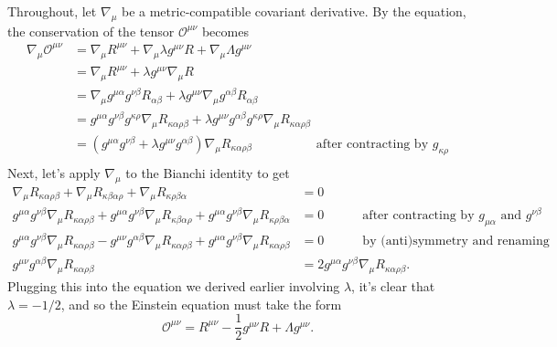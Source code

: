 \documentclass{../../templates/lkx_pset}
\begin{document}
\begin{solution}
  Throughout, let $\nabla_\mu$ be a metric-compatible covariant derivative.
  By the equation, the conservation of the tensor $\mathcal{O}^{\mu\nu}$ becomes
  \[
    \begin{aligned}
      \nabla_\mu \mathcal{O}^{\mu\nu}&= \nabla_\mu R^{\mu\nu} + \nabla_\mu \lambda g^{\mu\nu}R + \nabla_\mu\Lambda g^{\mu\nu}\\
      &= \nabla_\mu R^{\mu\nu} + \lambda g^{\mu\nu}\nabla_\mu R\\
      &= \nabla_\mu g^{\mu\alpha}g^{\nu\beta}R_{\alpha\beta} + \lambda g^{\mu\nu}\nabla_\mu g^{\alpha\beta}R_{\alpha\beta}\\
      &= 
      g^{\mu\alpha} g^{\nu\beta} g^{\kappa\rho} \nabla_\mu R_{\kappa\alpha\rho\beta}
      +\lambda g^{\mu\nu}g^{\alpha\beta} g^{\kappa\rho} \nabla_\mu R_{\kappa\alpha\rho\beta} \\
      &= (g^{\mu\alpha}g^{\nu\beta} + \lambda g^{\mu\nu}g^{\alpha\beta}) \nabla_\mu R{_{\kappa\alpha\rho\beta}}\hspace{5em}\textrm{after contracting by }g_{\kappa\rho} \\
    \end{aligned}
  \]
  Next, let's apply $\nabla_\mu$ to the Bianchi identity to get
  \[
    \begin{aligned}
      \nabla_\mu R_{\kappa\alpha\rho\beta} + \nabla_\mu R_{\kappa\beta\alpha\rho} + \nabla_\mu R_{\kappa\rho\beta\alpha}
      &=0\\
      g^{\mu\alpha} g^{\nu\beta} \nabla_\mu R_{\kappa\alpha\rho\beta} +  g^{\mu\alpha} g^{\nu\beta}  \nabla_\mu R_{\kappa\beta\alpha\rho} + g^{\mu\alpha} g^{\nu\beta} \nabla_\mu R_{\kappa\rho\beta\alpha}
      &=0 \hspace{3em}\textrm{after contracting by } g_{\mu\alpha}\textrm{ and }g^{\nu\beta} \\
        g^{\mu\alpha} g^{\nu\beta} \nabla_\mu R_{\kappa\alpha\rho\beta} 
      - g^{\mu\nu} g^{\alpha\beta} \nabla_\mu R_{\kappa\alpha\rho\beta} 
      + g^{\mu\alpha} g^{\nu\beta} \nabla_\mu R_{\kappa\alpha\rho\beta}
      &=0 \hspace{3em}\textrm{by (anti)symmetry and renaming variables} \\
      g^{\mu\nu}g^{\alpha\beta}\nabla_\mu R_{\kappa\alpha\rho\beta} &= 2g^{\mu\alpha}g^{\nu\beta}\nabla_\mu R_{\kappa\alpha\rho\beta}.
    \end{aligned}
  \]
  Plugging this into the equation we derived earlier involving $\lambda$, it's clear that $\lambda = -1/2$, and so the Einstein equation must take the form
  \[
    \mathcal{O}^{\mu\nu} = R^{\mu\nu} - \frac{1}{2}g^{\mu\nu} R + \Lambda g^{\mu\nu}.
  \]
\end{solution}
\end{document}
